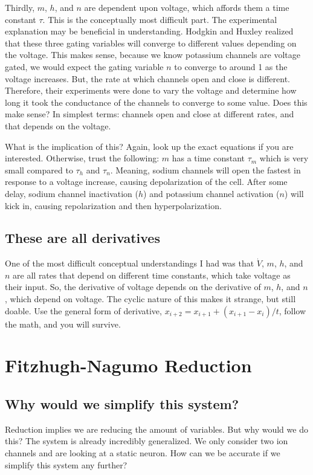 \documentclass[12pt]{amsart}
\begin{document}
Thirdly, $m$, $h$, and $n$ are dependent upon voltage, which affords them a time constant $\tau$. This is the conceptually most difficult part. The experimental explanation may be beneficial in understanding. Hodgkin and Huxley realized that these three gating variables will converge to different values depending on the voltage. This makes sense, because we know potassium channels are voltage gated, we would expect the gating variable $n$ to converge to around 1 as the voltage increases. But, the rate at which channels open and close is different. Therefore, their experiments were done to vary the voltage and determine how long it took the conductance of the channels to converge to some value. Does this make sense? In simplest terms: channels open and close at different rates, and that depends on the voltage.\newline

What is the implication of this? Again, look up the exact equations if you are interested. Otherwise, trust the following: $m$ has a time constant $\tau_m$ which is very small compared to $\tau_h$ and $\tau_n$. Meaning, sodium channels will open the fastest in response to a voltage increase, causing depolarization of the cell. After some delay, sodium channel inactivation ($h$) and potassium channel activation ($n$) will kick in, causing repolarization and then hyperpolarization. 

\subsection{These are all derivatives} One of the most difficult conceptual understandings I had was that $\dot{V}$, $m$, $h$, and $n$ are all rates that depend on different time constants, which take voltage as their input. So, the derivative of voltage depends on the derivative of $m$, $h$, and $n$, which depend on voltage. The cyclic nature of this makes it strange, but still doable. Use the general form of derivative, $x_{i+2} = x_{i+1} + (x_{i+1} - x_i)/t$, follow the math, and you will survive.

\section{Fitzhugh-Nagumo Reduction}

\subsection{Why would we simplify this system?} Reduction implies we are reducing the amount of variables. But why would we do this? The system is already incredibly generalized. We only consider two ion channels and are looking at a static neuron. How can we be accurate if we simplify this system any further?\newline
\end{document}
